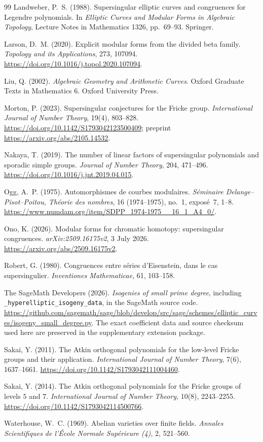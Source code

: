 \documentclass[11pt,a4paper]{article}
\numberwithin{equation}{section}
\theoremstyle{definition}
\theoremstyle{remark}
\begin{document}
\begin{thebibliography}{99}
 Landweber, P.~S. (1988). Supersingular elliptic curves and congruences for Legendre polynomials. In \emph{Elliptic Curves and Modular Forms in Algebraic Topology}, Lecture Notes in Mathematics 1326, pp.~69--93. Springer.

 Larson, D.~M. (2020). Explicit modular forms from the divided beta family. \emph{Topology and its Applications}, 273, 107094. \url{https://doi.org/10.1016/j.topol.2020.107094}.

 Liu, Q. (2002). \emph{Algebraic Geometry and Arithmetic Curves}. Oxford Graduate Texts in Mathematics 6. Oxford University Press.


 Morton, P. (2023). Supersingular conjectures for the
Fricke group. \emph{International Journal of Number Theory}, 19(4), 803--828.
\url{https://doi.org/10.1142/S1793042123500409}; preprint
\url{https://arxiv.org/abs/2105.14532}.

 Nakaya, T. (2019). The number of linear factors of
supersingular polynomials and sporadic simple groups. \emph{Journal of Number Theory},
204, 471--496. \url{https://doi.org/10.1016/j.jnt.2019.04.015}.


 Ogg, A.~P. (1975).
Automorphismes de courbes modulaires.
\emph{S\'eminaire Delange--Pisot--Poitou, Th\'eorie des nombres},
16 (1974--1975), no.~1, expos\'e~7, 1--8.
\url{https://www.numdam.org/item/SDPP_1974-1975__16_1_A4_0/}.

 Ono, K. (2026). Modular forms for chromatic homotopy: supersingular congruences. \emph{arXiv:2509.16175v2}, 3 July 2026. \url{https://arxiv.org/abs/2509.16175v2}.


 Robert, G. (1980). Congruences entre s\'eries d'Eisenstein, dans le cas supersingulier. \emph{Inventiones Mathematicae}, 61, 103--158.

 The SageMath Developers (2026).
\emph{Isogenies of small prime degree}, including
\texttt{\_hyperelliptic\_isogeny\_data}, in the SageMath source code.
\url{https://github.com/sagemath/sage/blob/develop/src/sage/schemes/elliptic_curves/isogeny_small_degree.py}.
The exact coefficient data and source checksum used here are preserved
in the supplementary extension package.

 Sakai, Y. (2011). The Atkin orthogonal polynomials for
the low-level Fricke groups and their application.
\emph{International Journal of Number Theory}, 7(6), 1637--1661.
\url{https://doi.org/10.1142/S1793042111004460}.

 Sakai, Y. (2014). The Atkin orthogonal polynomials for
the Fricke groups of levels $5$ and $7$.
\emph{International Journal of Number Theory}, 10(8), 2243--2255.
\url{https://doi.org/10.1142/S1793042114500766}.

 Waterhouse, W.~C. (1969). Abelian varieties over finite fields. \emph{Annales Scientifiques de l'\'Ecole Normale Sup\'erieure (4)}, 2, 521--560.
\end{thebibliography}
\end{document}
